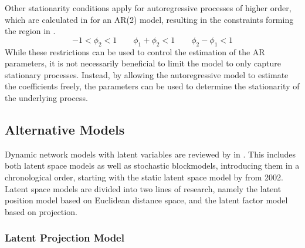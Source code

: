     Other stationarity conditions apply for autoregressive processes of higher order, which are calculated in \cite{giles2012stationarity} for an AR(2) model, resulting in the constraints forming the region in .
    \begin{equation}\label{eq:ar-2-constraints}
        -1<\phi_2<1 \qquad \phi_1+\phi_2<1 \qquad \phi_2-\phi_1<1
    \end{equation}
    While these restrictions can be used to control the estimation of the AR parameters, it is not necessarily beneficial to limit the model to only capture stationary processes. Instead, by allowing the autoregressive model to estimate the coefficients freely, the parameters can be used to determine the stationarity of the underlying process.
    
    
\subsection{Alternative Models}

    Dynamic network models with latent variables are reviewed by \citeauthor{kim2018review} in \cite{kim2018review}. This includes both latent space models as well as stochastic blockmodels, introducing them in a chronological order, starting with the static latent space model by \citeauthor*{hoff2002latent} \cite{hoff2002latent} from 2002. Latent space models are divided into two lines of research, namely the latent position model \cite{handcock2015clustering} based on Euclidean distance space, and the latent factor model \cite{hoff2009bilinear} based on projection.
    
    \subsubsection{Latent Projection Model}
    
